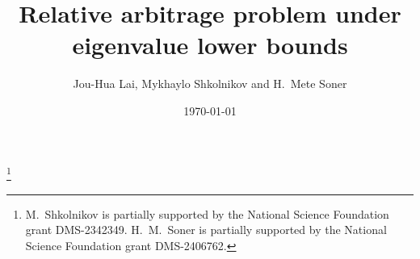 \documentclass[11pt]{amsart}
\numberwithin{equation}{section}
\begin{document}
\theoremstyle{plain}
\newtheorem{thm}{Theorem}[section]
\newtheorem{rem}{Remark}[section]
\newtheorem{lemma}[thm]{Lemma}
\newtheorem{prop}[thm]{Proposition}
\newtheorem{cor}[thm]{Corollary}


\theoremstyle{definition}
\newtheorem{defn}{Definition}[section]
\newtheorem{cond}{Condition}
\newtheorem{asmp}{Assumption}
\newtheorem{notn}{Notation}
\newtheorem{prb}{Problem}

\theoremstyle{remark}
\newtheorem{rmk}{Remark}[section]
\newtheorem{exm}{Example}[section]
\newtheorem{clm}{Claim}


\newcommand{\ms}[1]{\color{RedOrange} {#1}}

\title[Relative arbitrage problem]{Relative arbitrage problem under eigenvalue lower bounds}

\author{Jou-Hua Lai, Mykhaylo Shkolnikov and H.~Mete Soner}
\address{ORFE Department \\ Princeton University \\ Princeton, NJ 08544}
\address{Department of Mathematical Sciences and Center for Nonlinear Analysis\\Carnegie Mellon University \\  Pittsburgh, PA 15213}
\address{ORFE Department \\ Princeton University \\ Princeton, NJ 08544}




\thanks{M.~Shkolnikov is partially supported by the National Science Foundation grant DMS-2342349. H.~M.~Soner is partially supported by the National Science Foundation grant DMS-2406762.}

\date{\today}
\end{document}
